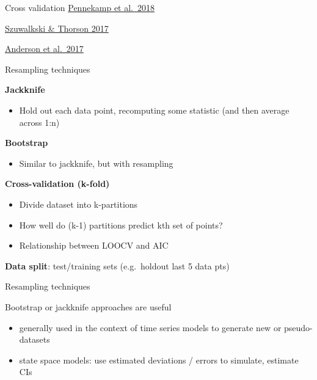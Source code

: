\documentclass[ignorenonframetext,]{beamer}
\providecommand{\tightlist}{%
  \setlength{\itemsep}{0pt}\setlength{\parskip}{0pt}}
\begin{document}
\begin{frame}[fragile]
\begin{block}{Cross validation}
\href{https://www.biorxiv.org/content/early/2018/06/19/350017}{Pennekamp
et al.~2018}

\href{https://onlinelibrary.wiley.com/doi/abs/10.1111/faf.12226}{Szuwalkski
\& Thorson 2017}

\href{https://onlinelibrary.wiley.com/doi/abs/10.1111/faf.12200}{Anderson
et al.~2017}

\end{block}

\begin{block}{Resampling techniques}

\textbf{Jackknife}

\begin{itemize}
\tightlist
\item
  Hold out each data point, recomputing some statistic (and then average
  across 1:n)
\end{itemize}

\textbf{Bootstrap}

\begin{itemize}
\tightlist
\item
  Similar to jackknife, but with resampling
\end{itemize}

\textbf{Cross-validation (k-fold)}

\begin{itemize}
\tightlist
\item
  Divide dataset into k-partitions
\item
  How well do (k-1) partitions predict kth set of points?
\item
  Relationship between LOOCV and AIC
\end{itemize}

\textbf{Data split}: test/training sets (e.g.~holdout last 5 data pts)

\end{block}

\begin{block}{Resampling techniques}

Bootstrap or jackknife approaches are useful

\begin{itemize}
\item
  generally used in the context of time series models to generate new or
  pseudo-datasets
\item
  state space models: use estimated deviations / errors to simulate,
  estimate CIs
\end{itemize}


\end{block}
\end{frame}
\end{document}
